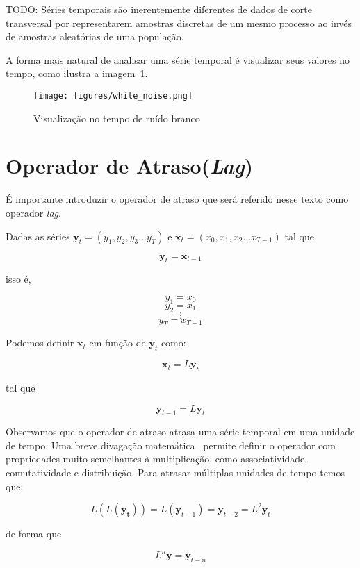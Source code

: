 TODO: Séries temporais são inerentemente diferentes de dados de corte
transversal por representarem amostras discretas de um mesmo processo ao invés
de amostras aleatórias de uma população.

A forma mais natural de analisar uma série temporal é visualizar seus valores
no tempo, como ilustra a imagem~\ref{fig:example}.

\begin{figure}[H]
    \centering
    \texttt{[image: figures/white\_noise.png]}
    \caption{Visualização no tempo de ruído branco}
    \label{fig:example}
\end{figure}


\section{Operador de Atraso(\emph{Lag})}

É importante introduzir o operador de atraso que será referido nesse texto
como operador \emph{lag}.

Dadas as séries $\mathbf{y}_t = (y_1, y_2, y_3 \dots y_T)$ e
$\mathbf{x}_t = (x_0, x_1, x_2 \dots x_{T-1})$ tal que

$$ \mathbf{y}_t = \mathbf{x}_{t-1}$$

isso é,

$$ y_1 = x_0 $$
$$ y_2 = x_1 $$
$$ \vdots $$
$$ y_T = x_{T-1} $$

Podemos definir $\mathbf{x}_t$ em função de $\mathbf{y}_t$ como:

$$ \mathbf{x}_t = L\mathbf{y}_t $$

tal que

$$\boxed{\mathbf{y}_{t-1} = L\mathbf{y}_t}$$

Observamos que o operador de atraso atrasa uma série temporal em uma unidade
de tempo. Uma breve divagação matemática~\cite{hamilton} permite definir o
operador com propriedades muito semelhantes à multiplicação, como
associatividade, comutatividade e distribuição. Para atrasar múltiplas unidades
de tempo temos que:

\vspace{1cm}

$$L(L(\mathbf{y_t})) = L(\mathbf{y}_{t-1}) = \mathbf{y}_{t-2} = L^2 \mathbf{y}_{t}$$

\vspace{1cm}

de forma que

$$ L^n {\mathbf{y}} =  \mathbf{y}_{t-n}$$

